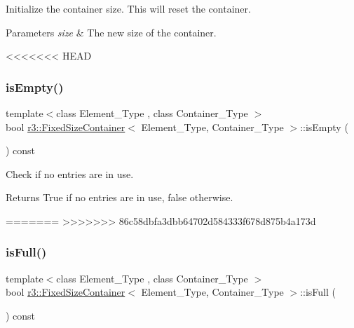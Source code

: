 Initialize the container size. This will reset the container. 


\begin{DoxyParams}{Parameters}
{\em size} & The new size of the container. \\
\hline
\end{DoxyParams}
<<<<<<< HEAD
\mbox{\label{classr3_1_1_fixed_size_container_adde8deee5146abd862ef32e1ac3bb879}} 
\subsubsection{\texorpdfstring{is\+Empty()}{isEmpty()}}
{\footnotesize\ttfamily template$<$class Element\+\_\+\+Type , class Container\+\_\+\+Type $>$ \\
bool \mbox{\hyperlink{classr3_1_1_fixed_size_container}{r3\+::\+Fixed\+Size\+Container}}$<$ Element\+\_\+\+Type, Container\+\_\+\+Type $>$\+::is\+Empty (\begin{DoxyParamCaption}{ }\end{DoxyParamCaption}) const}



Check if no entries are in use. 

\begin{DoxyReturn}{Returns}
True if no entries are in use, false otherwise. 
\end{DoxyReturn}
=======
>>>>>>> 86c58dbfa3dbb64702d584333f678d875b4a173d
\mbox{\label{classr3_1_1_fixed_size_container_ae3beb2a45a67d3bd4f6cb32f39805889}} 
\subsubsection{\texorpdfstring{is\+Full()}{isFull()}}
{\footnotesize\ttfamily template$<$class Element\+\_\+\+Type , class Container\+\_\+\+Type $>$ \\
bool \mbox{\hyperlink{classr3_1_1_fixed_size_container}{r3\+::\+Fixed\+Size\+Container}}$<$ Element\+\_\+\+Type, Container\+\_\+\+Type $>$\+::is\+Full (\begin{DoxyParamCaption}{ }\end{DoxyParamCaption}) const}



